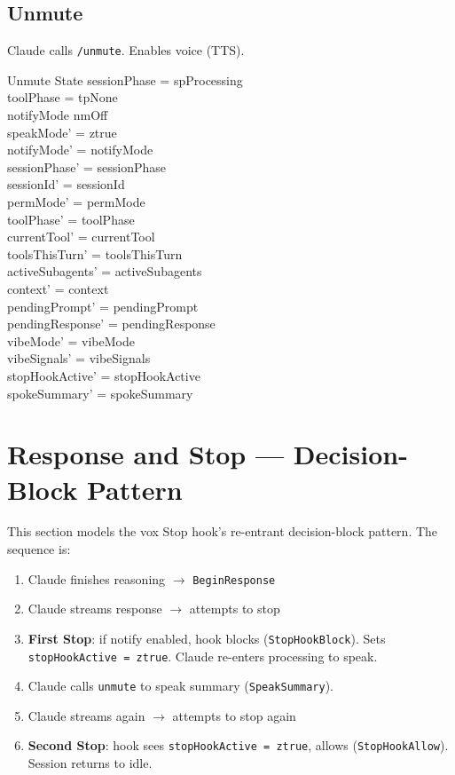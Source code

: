 \documentclass[a4paper,10pt,fleqn]{article}
\begin{document}
\subsection{Unmute}

Claude calls \texttt{/unmute}. Enables voice (TTS).

\begin{schema}{Unmute}
  \Delta State
  \where
  sessionPhase = spProcessing \\
  toolPhase = tpNone \\
  notifyMode \neq nmOff \\
  speakMode' = ztrue \\
  notifyMode' = notifyMode \\
  sessionPhase' = sessionPhase \\
  sessionId' = sessionId \\
  permMode' = permMode \\
  toolPhase' = toolPhase \\
  currentTool' = currentTool \\
  toolsThisTurn' = toolsThisTurn \\
  activeSubagents' = activeSubagents \\
  context' = context \\
  pendingPrompt' = pendingPrompt \\
  pendingResponse' = pendingResponse \\
  vibeMode' = vibeMode \\
  vibeSignals' = vibeSignals \\
  stopHookActive' = stopHookActive \\
  spokeSummary' = spokeSummary
\end{schema}

\section{Response and Stop --- Decision-Block Pattern}

This section models the vox Stop hook's re-entrant decision-block
pattern. The sequence is:

\begin{enumerate}
  \item Claude finishes reasoning $\to$ \texttt{BeginResponse}
  \item Claude streams response $\to$ attempts to stop
  \item \textbf{First Stop}: if notify enabled, hook blocks
    (\texttt{StopHookBlock}). Sets \texttt{stopHookActive = ztrue}.
    Claude re-enters processing to speak.
  \item Claude calls \texttt{unmute} to speak summary
    (\texttt{SpeakSummary}).
  \item Claude streams again $\to$ attempts to stop again
  \item \textbf{Second Stop}: hook sees \texttt{stopHookActive = ztrue},
    allows (\texttt{StopHookAllow}). Session returns to idle.
\end{enumerate}
\end{document}
